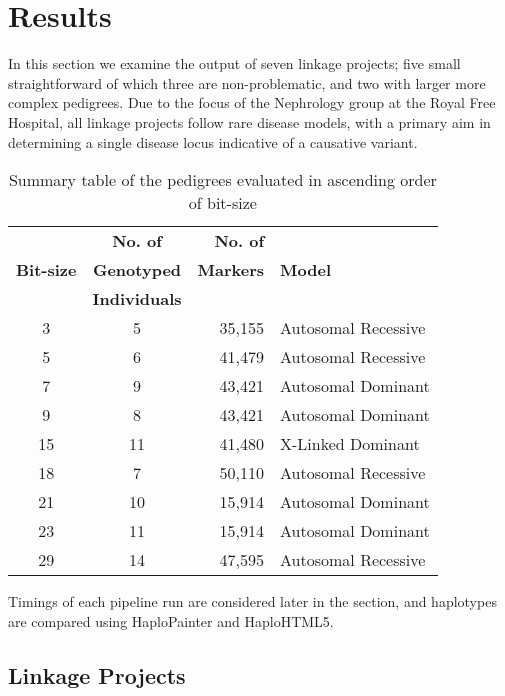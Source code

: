 \chapter{Results}

In this section we examine the output of seven linkage projects; five small straightforward of which three are non-problematic, and two with larger more complex pedigrees. Due to the focus of the Nephrology group at the Royal Free Hospital, all linkage projects follow rare disease models, with a primary aim in determining a single disease locus indicative of a causative variant.

\begin{table}[h]
\begin{center}
\begin{tabular}{ c c r l } \toprule
              & \textbf{No. of}      & \textbf{No. of}  &                  \\
\textbf{Bit-size} & \textbf{Genotyped}   & \textbf{Markers} & \textbf{Model} \\
              & \textbf{Individuals} &                  &                  \\
\midrule
3 & 5 & 35,155 & Autosomal Recessive \\
5 & 6 & 41,479 & Autosomal Recessive \\
7 & 9 & 43,421 & Autosomal Dominant \\
9 & 8 & 43,421 & Autosomal Dominant \\
15 & 11 & 41,480 & X-Linked Dominant \\
18 & 7 & 50,110 & Autosomal Recessive \\
21 & 10 & 15,914 & Autosomal Dominant \\
23 & 11 & 15,914 & Autosomal Dominant \\
29 & 14 & 47,595 & Autosomal Recessive \\
\hline
\end{tabular}
\end{center}
\caption[Pedigrees by Bit-Size]{Summary table of the pedigrees evaluated in ascending order of bit-size}\label{table:res:evaluated}
\end{table}

Timings of each pipeline run are considered later in the section, and haplotypes are compared using HaploPainter and HaploHTML5.


\section{Linkage Projects}

